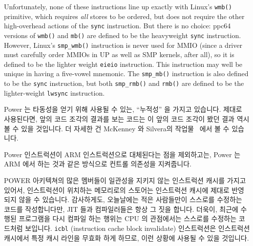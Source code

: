 Unfortunately, none of these instructions line up exactly with Linux's
{\tt wmb()} primitive, which requires {\em all} stores to be ordered,
but does not require the other high-overhead actions of the {\tt sync}
instruction.
But there is no choice: ppc64 versions of {\tt wmb()} and {\tt mb()} are
defined to be the heavyweight {\tt sync} instruction.
However, Linux's {\tt smp\_wmb()} instruction is never used for MMIO
(since a driver must carefully order MMIOs in UP as well as
SMP kernels, after all), so it is defined to be the lighter weight
{\tt eieio} instruction.
This instruction may well be unique in having a five-vowel mnemonic.
The {\tt smp\_mb()} instruction is also defined to be the {\tt sync}
instruction, but both {\tt smp\_rmb()} and {\tt rmb()} are defined to
be the lighter-weight {\tt lwsync} instruction.
\fi

Power 는 타동성을 얻기 위해 사용될 수 있는, ``누적성'' 을 가지고 있습니다.
제대로 사용된다면, 앞의 코드 조각의 결과를 보는 코드는 이 앞의 코드 조각이 봤던
결과 역시 볼 수 있을 것입니다.
더 자세한 건 McKenney 와 Silvera의 작업물~\cite{PaulEMcKenneyN2745r2009} 에서
볼 수 있습니다.

Power  인스트럭션이 ARM  인스트럭션으로 대체된다는 점을
제외하고는, Power 는 ARM 에서 하는 것과 같은 방식으로 컨트롤 의존성을
지켜줍니다.

POWER 아키텍쳐의 많은 멤버들이 일관성을 지키지 않는 인스트럭션 캐시를 가지고
있어서, 인스트럭션이 위치하는 메모리로의 스토어는 인스트럭션 캐시에 제대로
반영되지 않을 수 있습니다.
감사하게도, 오늘날에는 적은 사람들만이 스스로를 수정하는 코드를 작성합니다만,
JIT 들과 컴파일러들은 항상 그 짓을 합니다.
더욱이, 최근에 수행된 프로그램을 다시 컴파일 하는 행위는 CPU 의 관점에서는
스스로를 수정하는 코드처럼 보입니다.
{\tt icbl} (instruction cache block invalidate) 인스트럭션은 인스트럭션
캐시에서 특정 캐시 라인을 무효화 하게 하므로, 이런 상황에 사용될 수 있을
것입니다.

